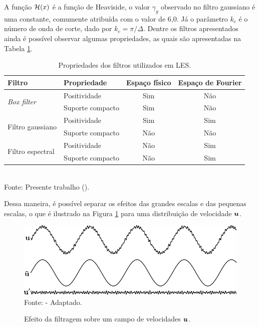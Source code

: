 A função $\mathcal{H}(x)$ é a função de Heaviside, o valor $\gamma_g$ observado no filtro gaussiano é uma constante, comumente atribuída com o valor de 6,0. Já o parâmetro $k_c$ é o número de onda de corte, dado por $k_c=\pi/\Delta$. Dentre os filtros apresentados ainda é possível observar algumas propriedades, as quais são apresentadas na Tabela \ref{tab:filters2}.

\begin{table}[h!]
    \centering
    \caption{Propriedades dos filtros utilizados em LES.}
    \begin{tabular}{llcc}
        \hline
        Filtro                               & Propriedade      & Espaço físico & Espaço de Fourier \\\hline
        \multirow{2}{*}{\textit{Box filter}} & Positividade     & Sim           & Não               \\
                                             & Suporte compacto & Sim           & Não               \\\hline
        \multirow{2}{*}{Filtro gaussiano}    & Positividade     & Sim           & Sim               \\
                                             & Suporte compacto & Não           & Não               \\\hline
        \multirow{2}{*}{Filtro espectral}    & Positividade     & Não           & Sim               \\
                                             & Suporte compacto & Não           & Sim               \\\hline
    \end{tabular}
    \\Fonte: Presente trabalho (\the\year).
    \label{tab:filters2}
\end{table}


Dessa maneira, é possível separar os efeitos das grandes escalas e das pequenas escalas, o que é ilustrado na Figura \ref{fig:EfeitoFiltragem} para uma distribuição de velocidade $\boldsymbol{u}$.

\begin{figure}[h!]
    \centering
    \caption{Efeito da filtragem sobre um campo de velocidades $\boldsymbol{u}$.}
    \includegraphics[width=.75\linewidth]{Figuras/efeito_filtragem.pdf}
    \\Fonte:  - Adaptado.
    \label{fig:EfeitoFiltragem}
\end{figure}

